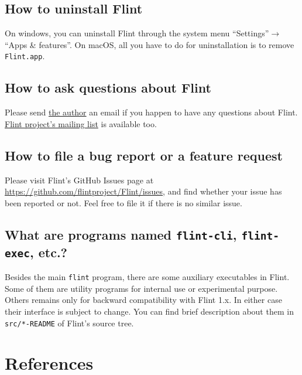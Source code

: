 \documentclass[a4paper,10pt]{report}
\begin{document}
\section{How to uninstall Flint}
\label{sec:orga087255}
On windows, you can uninstall Flint through the system menu ``Settings''\(\to\)``Apps \& features''.
On macOS, all you have to do for uninstallation is to remove \texttt{Flint.app}.

\section{How to ask questions about Flint}
\label{sec:orga401e08}
Please send \href{mailto:tabe@fixedpoint.jp}{the author} an email if you happen to have any questions about Flint.
\href{https://groups.google.com/g/flint-discuss}{Flint project's mailing list} is available too.

\section{How to file a bug report or a feature request}
\label{sec:org22266df}
Please visit Flint's GitHub Issues page at
\url{https://github.com/flintproject/Flint/issues},
and find whether your issue has been reported or not.
Feel free to file it if there is no similar issue.

\section{What are programs named \texttt{flint-cli}, \texttt{flint-exec}, etc.?}
\label{sec:org9625fcc}
Besides the main \texttt{flint} program, there are some auxiliary executables in
Flint. Some of them are utility programs for internal use or experimental
purpose. Others remains only for backward compatibility with Flint 1.x. In
either case their interface is subject to change. You can find brief description about
them in \texttt{src/*-README} of Flint's source tree.

\chapter{References}
\label{sec:orgd134ae5}
\end{document}
